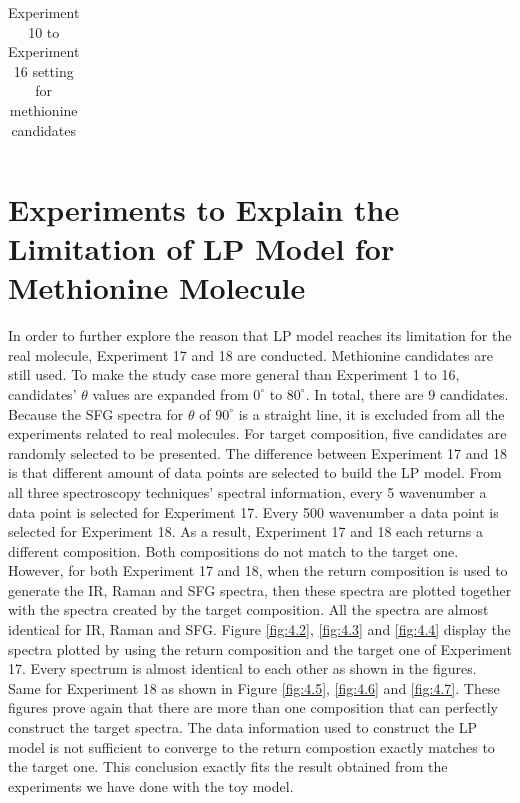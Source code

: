 \begin{table}
\begin{center}
{\begin{tabular}{| l | p{3cm} | l | l |}
\end{tabular} 
}
\end{center}
\caption{Experiment 10 to Experiment 16 setting for methionine candidates} \label{tab:4.3}
\end{table}

\section{Experiments to Explain the Limitation of LP Model for Methionine Molecule}

In order to further explore the reason that LP model reaches its limitation for the real molecule, Experiment 17 and 18 are conducted. Methionine candidates are still used. To make the study case more general than Experiment 1 to 16, candidates' $\theta$ values are expanded from $0^{\circ}$ to $80^{\circ}$. In total, there are $9$ candidates. Because the SFG spectra for $\theta$ of $90^{\circ}$ is a straight line, it is excluded from all the experiments related to real molecules. For target composition, five candidates are randomly selected to be presented. The difference between Experiment 17 and 18 is that different amount of data points are selected to build the LP model. From all three spectroscopy techniques' spectral information, every 5 wavenumber a data point is selected for Experiment 17. Every 500 wavenumber a data point is selected for Experiment 18. As a result, Experiment 17 and 18 each returns a different composition. Both compositions do not match to the target one. \\

However, for both Experiment 17 and 18, when the return composition is used to generate the IR, Raman and SFG spectra, then these spectra are plotted together with the spectra created by the target composition. All the spectra are almost identical for IR, Raman and SFG. Figure \ref{fig:4.2}, \ref{fig:4.3} and \ref{fig:4.4} display the spectra plotted by using the return composition and the target one of Experiment 17. Every spectrum is almost identical to each other as shown in the figures. Same for Experiment 18 as shown in Figure \ref{fig:4.5}, \ref{fig:4.6} and \ref{fig:4.7}. These figures prove again that there are more than one composition that can perfectly construct the target spectra. The data information used to construct the LP model is not sufficient to converge to the return compostion exactly matches to the target one. This conclusion exactly fits the result obtained from the experiments we have done with the toy model.\\

